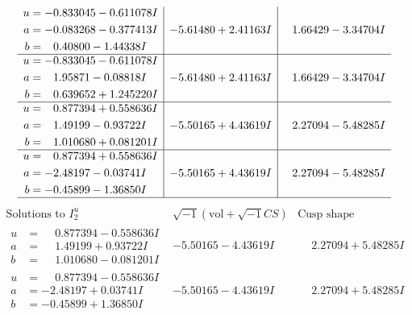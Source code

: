 \documentclass[1p]{elsarticle_modified}
\theoremstyle{definition}
\newcommand{\I}{\sqrt{-1}}
\begin{document}
$$\begin{array}{c|c|c}
\begin{aligned}
u &= -0.833045 - 0.611078 I \\
a &= -0.083268 - 0.377413 I \\
b &= \phantom{-}0.40800 - 1.44338 I\end{aligned}
 & -5.61480 + 2.41163 I & \phantom{-}1.66429 - 3.34704 I \\ \hline\begin{aligned}
u &= -0.833045 - 0.611078 I \\
a &= \phantom{-}1.95871 - 0.08818 I \\
b &= \phantom{-}0.639652 + 1.245220 I\end{aligned}
 & -5.61480 + 2.41163 I & \phantom{-}1.66429 - 3.34704 I \\ \hline\begin{aligned}
u &= \phantom{-}0.877394 + 0.558636 I \\
a &= \phantom{-}1.49199 - 0.93722 I \\
b &= \phantom{-}1.010680 + 0.081201 I\end{aligned}
 & -5.50165 + 4.43619 I & \phantom{-}2.27094 - 5.48285 I \\ \hline\begin{aligned}
u &= \phantom{-}0.877394 + 0.558636 I \\
a &= -2.48197 - 0.03741 I \\
b &= -0.45899 - 1.36850 I\end{aligned}
 & -5.50165 + 4.43619 I & \phantom{-}2.27094 - 5.48285 I\\
 \hline 
 \end{array}$$\newpage$$\begin{array}{c|c|c}  
\text{Solutions to }I^u_{2}& \I (\text{vol} + \sqrt{-1}CS) & \text{Cusp shape}\\
 \hline 
\begin{aligned}
u &= \phantom{-}0.877394 - 0.558636 I \\
a &= \phantom{-}1.49199 + 0.93722 I \\
b &= \phantom{-}1.010680 - 0.081201 I\end{aligned}
 & -5.50165 - 4.43619 I & \phantom{-}2.27094 + 5.48285 I \\ \hline\begin{aligned}
u &= \phantom{-}0.877394 - 0.558636 I \\
a &= -2.48197 + 0.03741 I \\
b &= -0.45899 + 1.36850 I\end{aligned}
 & -5.50165 - 4.43619 I & \phantom{-}2.27094 + 5.48285 I \\ \hline\begin{aligned}

\end{aligned}
\end{array}$$
\end{document}
